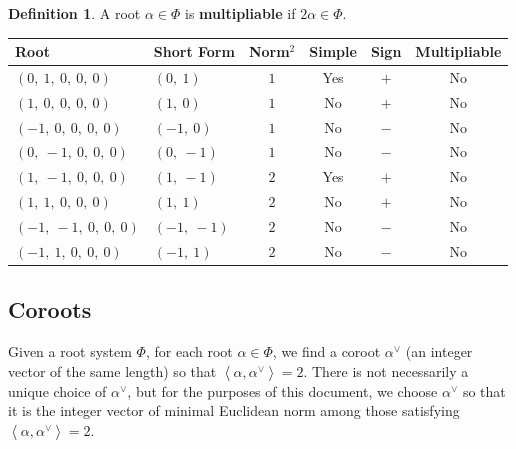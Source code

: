 \documentclass[11pt]{article}
\newcommand{\noi}{\noindent}
\newcommand{\tbf}{\textbf}
\newcommand{\la}{\left\langle}
\newcommand{\ra}{\right\rangle}
\theoremstyle{definition}
\newtheorem{definition}{Definition}[section]
\begin{document}
\begin{definition}
A root $\alpha \in \Phi$ is \tbf{multipliable} if $2\alpha \in \Phi$.
\end{definition}

\noi \begin{tabular}{|l|l|c|c|c|c|}
    \hline
    \textbf{Root} & \textbf{Short Form} & \textbf{Norm$^2$} & \textbf{Simple} & \textbf{Sign} & \textbf{Multipliable} \\
    \hline
    $\left( 0, \  1, \  0, \  0, \  0\right)$ & $\left( 0, \  1\right)$ & $1$ & Yes & $+$ & No \\
    \hline
    $\left( 1, \  0, \  0, \  0, \  0\right)$ & $\left( 1, \  0\right)$ & $1$ & No & $+$ & No \\
    \hline
    $\left( -1, \  0, \  0, \  0, \  0\right)$ & $\left( -1, \  0\right)$ & $1$ & No & $-$ & No \\
    \hline
    $\left( 0, \  -1, \  0, \  0, \  0\right)$ & $\left( 0, \  -1\right)$ & $1$ & No & $-$ & No \\
    \hline
    $\left( 1, \  -1, \  0, \  0, \  0\right)$ & $\left( 1, \  -1\right)$ & $2$ & Yes & $+$ & No \\
    \hline
    $\left( 1, \  1, \  0, \  0, \  0\right)$ & $\left( 1, \  1\right)$ & $2$ & No & $+$ & No \\
    \hline
    $\left( -1, \  -1, \  0, \  0, \  0\right)$ & $\left( -1, \  -1\right)$ & $2$ & No & $-$ & No \\
    \hline
    $\left( -1, \  1, \  0, \  0, \  0\right)$ & $\left( -1, \  1\right)$ & $2$ & No & $-$ & No \\
    \hline
\end{tabular}


\subsection{Coroots}

Given a root system $\Phi$, for each root $\alpha \in \Phi$, we find a coroot $\alpha^\vee$ (an integer vector of the same length) so that $\la \alpha, \alpha^\vee \ra = 2$. There is not necessarily a unique choice of $\alpha^\vee$, but for the purposes of this document, we choose $\alpha^\vee$ so that it is the integer vector of minimal Euclidean norm among those satisfying $\la \alpha, \alpha^\vee \ra = 2$.

\bigskip
\end{document}
